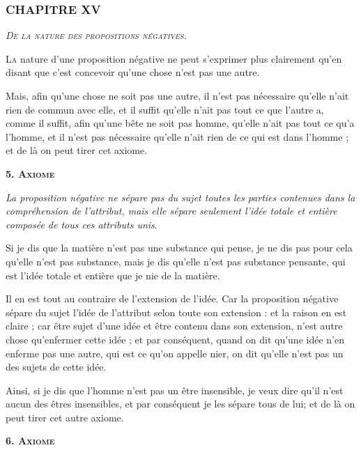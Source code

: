 \subsubsection{\centering \Large CHAPITRE XV}
\begin{center}\emph{\large\scshape De la nature des propositions négatives.}\end{center}

	\lettrine{L}{a} nature d'une proposition négative ne peut s'exprimer plus clairement qu'en disant que c'est concevoir qu'une chose n'est pas une autre.

Mais, afin qu'une chose ne soit pas une autre, il n'est pas nécessaire qu'elle n'ait rien de commun avec elle, et il suffit qu'elle n'ait pas tout ce que l'autre a, comme il suffit, afin qu'une bête ne soit pas homme, qu'elle n'ait pas tout ce qu'a l'homme, et il n'est pas nécessaire qu'elle n'ait rien de ce qui est dans l'homme ; et de là on peut tirer cet axiome.



\begin{center}{\bfseries\scshape 5. Axiome}\end{center}

	\emph{La proposition négative ne sépare pas du sujet toutes les parties contenues dans la compréhension de l'attribut, mais elle sépare seulement l'idée totale et entière composée de tous ces attributs unis}.

Si je dis que la matière n'est pas une substance qui pense, je ne dis pas pour cela qu'elle n'est pas substance, mais je dis qu'elle n'est pas substance pensante, qui est l'idée totale et entière que je nie de la matière.

Il en est tout au contraire de l'extension de l'idée. Car la proposition négative sépare du sujet l'idée de l'attribut selon toute son extension : et la raison en est claire ; car être sujet d'une idée et être contenu dans son extension, n'est autre chose qu'enfermer cette idée ; et par conséquent, quand on dit qu'une idée n'en enferme pas une autre, qui est ce qu'on appelle nier, on dit qu'elle n'est pas un des sujets de cette idée.

Ainsi, si je dis que l'homme n'est pas un être insensible, je veux dire qu'il n'est aucun des êtres insensibles, et par conséquent je les sépare tous de lui; et de là on peut tirer cet autre axiome.

\begin{center}{\bfseries\scshape 6. Axiome}\end{center}

